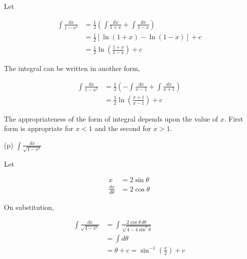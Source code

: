 \documentclass{article}
\begin{document}
Let

\[
\begin{align*}
\int \frac{dx}{1-x^2} &= \frac{1}{2} \left( \int \frac{dx}{1 + x} + \int \frac{dx}{1 - x} \right) \\
&= \frac{1}{2} [ \ln(1+x) - \ln(1-x) ] + c \\
&= \frac{1}{2} \ln \left( \frac{1+x}{1-x} \right) + c
\end{align*}
\]

The integral can be written in another form,

\[
\begin{align*}
\int \frac{dx}{1-x^2} &= \frac{1}{2} \left( - \int \frac{dx}{x-1} + \int \frac{dx}{x+1} \right) \\
&= \frac{1}{2} \ln \left( \frac{x+1}{x-1} \right) + c
\end{align*}
\]

The appropriateness of the form of integral depends upon the value of \( x \). First form is appropriate for \( x < 1 \) and the second for \( x > 1 \).

(p) \( \int \frac{dx}{\sqrt{4-x^2}} \)

Let

\[
\begin{align*}
x & = 2 \sin \theta \\
\frac{dx}{d\theta} & = 2 \cos \theta 
\end{align*}
\]

On substitution,

\[
\begin{align*}
\int \frac{dx}{\sqrt{4-x^2}} &= \int \frac{2 \cos \theta \, d\theta}{\sqrt{4 - 4 \sin^2 \theta}} \\
&= \int d\theta \\
&= \theta + c = \sin^{-1} \left( \frac{x}{2} \right) + c
\end{align*}
\]
\end{document}
